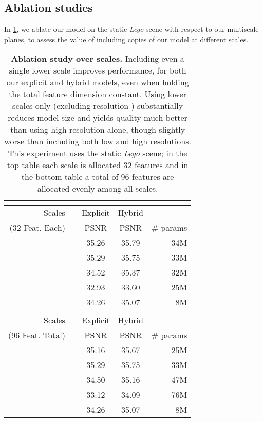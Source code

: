 \documentclass[10pt,twocolumn,letterpaper]{article}
\makeatletter
\renewcommand{\paragraph}{\@startsection{paragraph}{4}{\z@}{0.65ex \@plus 1ex \@minus .2ex}{-1em}{\normalfont \normalsize \bfseries }}
\makeatother
\begin{document}
\subsection{Ablation studies}

\paragraph{Multiscale.}
In \cref{tab:multiscale}, we ablate our model on the static \emph{Lego} scene \cite{nerf} with respect to our multiscale planes, to assess the value of including copies of our model at different scales. 

\renewcommand{\tabcolsep}{6pt}
\begin{table}[ht]
  \centering
  \begin{tabular}{rlccr}
    \multicolumn{5}{c}{} \\
    \toprule
     Scales & & Explicit & Hybrid  &  \\ (32 Feat. Each) & & PSNR  & PSNR  & \# params  \\
    \cmidrule(){1-1} \cmidrule(){3-5}
     &&	35.26 & 35.79 & 34M \\
     && 35.29 & 35.75 & 33M \\
     && 34.52 & 35.37 & 32M \\
     && 32.93 & 33.60 & 25M \\
    \hspace{0.67cm} && 34.26 & 35.07 & 8M	\\
\bottomrule
    \\
    \toprule
     Scales & & Explicit & Hybrid  &  \\ (96 Feat. Total) & & PSNR  & PSNR  & \# params  \\
    \cmidrule(){1-1} \cmidrule(){3-5} 
     && 35.16 & 35.67 & 25M \\
     && 35.29 & 35.75 & 33M \\
     && 34.50 & 35.16 & 47M \\
     && 33.12 & 34.09 & 76M \\
    \hspace{0.67cm} && 34.26 & 35.07 & 8M \\
    \bottomrule
  \end{tabular}
  \caption{\textbf{Ablation study over scales.} 
  Including even a single lower scale improves performance, for both our explicit and hybrid models, even when holding the total feature dimension constant. Using lower scales only (excluding resolution ) substantially reduces model size and yields quality much better than using high resolution alone, though slightly worse than including both low and high resolutions. This experiment uses the static \emph{Lego} scene; in the top table each scale is allocated 32 features and in the bottom table a total of 96 features are allocated evenly among all scales.}
  \label{tab:multiscale}
\end{table}
\end{document}
